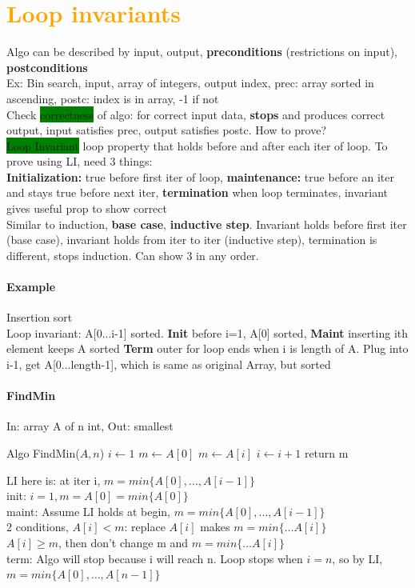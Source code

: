 \section{\textcolor{Orange}{Loop invariants}}
Algo can be described by input, output, \textbf{preconditions} (restrictions on input), \textbf{postconditions}
\\ Ex: Bin search, input, array of integers, output index, prec: array sorted in ascending, postc: index is in array, -1 if not
\\ Check \colorbox{Green}{correctness} of algo: for correct input data, \textbf{stops} and produces correct output, input satisfies prec, output satisfies postc. How to prove? 
\\ \colorbox{Green}{Loop Invariant} loop property that holds before and after each iter of loop. To prove using LI, need 3 things:
\\ \textbf{Initialization:} true before first iter of loop, \textbf{maintenance:} true before an iter and stays true before next iter, \textbf{termination} when loop terminates, invariant gives useful prop to show correct
\\ Similar to induction, \textbf{base case}, \textbf{inductive step}. Invariant holds before first iter (base case), invariant holds from iter to iter (inductive step), termination is different, stops induction. Can show 3 in any order.
\paragraph{Example}Insertion sort
\\ Loop invariant: A[0...i-1] sorted. \textbf{Init} before i=1, A[0] sorted, \textbf{Maint} inserting ith element keeps A sorted \textbf{Term} outer for loop ends when i is length of A. Plug into i-1, get A[0...length-1], which is same as original Array, but sorted
\paragraph{FindMin} In: array A of n int, Out: smallest
\begin{algorithmic}
	\State Algo FindMin($A,n$)
	\State $i \gets 1$
	\State $m \gets A[0]$
		 $m\gets A[i]$
		\State $i \gets i+1$
		\EndIf
	\EndWhile
	\State return m
\end{algorithmic}
LI here is: at iter i, $m=min\{A[0],\ldots,A[i-1]\}$
\\init: $i=1,m=A[0]=min\{A[0]\}$
\\maint: Assume LI holds at begin, $m=min\{A[0],\ldots,A[i-1]\}$
\\2 conditions, $A[i]<m$: replace $A[i]$ makes $m=min\{\ldots A[i]\}$
\\ $A[i]\geq m$, then don't change m and $m=min\{\ldots A[i]\}$
\\ term: Algo will stop because i will reach n. Loop stops when $i=n$, so by LI, $m=min\{A[0],\ldots,A[n-1]\}$
\color{ForestGreen}
